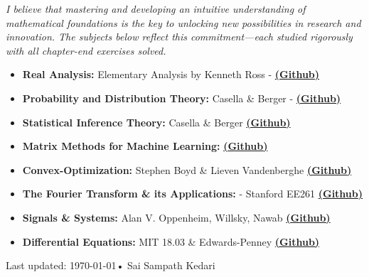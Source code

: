 \documentclass[10pt,a4paper,ragged2e,withhyper]{altacv}
\begin{document}
\textit{I believe that mastering and developing an intuitive understanding of mathematical foundations is the key to unlocking new possibilities in research and innovation. The subjects below reflect this commitment—each studied rigorously with all chapter-end exercises solved.}
\vspace{1em}
\begin{itemize}
    \item \textbf{Real Analysis:} Elementary Analysis by Kenneth Ross -  \href{https://github.com/SaiSampathKedari/Real-Analysis}{\textbf{(Github)}}
    
    \item \textbf{Probability and Distribution Theory:} Casella \& Berger - 
    \href{https://github.com/SaiSampathKedari/Probability-and-Distribution-Theory}{\textbf{(Github)}}
    
    \item \textbf{Statistical Inference Theory:} Casella \& Berger     \href{https://github.com/SaiSampathKedari/Statistical-Inference-Theory}{\textbf{(Github)}}
    
    \item \textbf{Matrix Methods for Machine Learning:}     \href{https://github.com/SaiSampathKedari/Matrix-Methods-Linear-Algebra-Machine-Learning}{\textbf{(Github)}}

    \item \textbf{Convex-Optimization:} Stephen Boyd \& Lieven Vandenberghe     \href{https://github.com/SaiSampathKedari/UMich-IOE611-Convex-Optimization}{\textbf{(Github)}}

    \item \textbf{The Fourier Transform \& its Applications:} - Stanford EE261     \href{https://github.com/SaiSampathKedari/Stanford-EE261-The-Fourier-Transform-and-its-Applications}{\textbf{(Github)}}

    \item \textbf{Signals \& Systems:} Alan V. Oppenheim, Willsky, Nawab     \href{https://github.com/SaiSampathKedari/Signals-and-Systems}{\textbf{(Github)}}

    \item \textbf{Differential Equations:} MIT 18.03 \& Edwards-Penney     \href{https://github.com/SaiSampathKedari/Differential-Equations}{\textbf{(Github)}}
\end{itemize}

\vfill
\begin{center}
\scriptsize Last updated: \today \quad • \quad Sai Sampath Kedari
\end{center}
\end{document}
